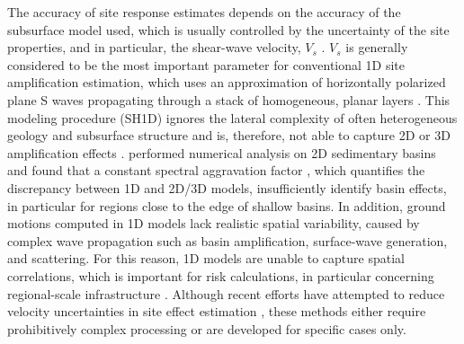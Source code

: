 The accuracy of site response estimates depends on the accuracy of the subsurface model used, which is usually controlled by the uncertainty of the site properties, and in particular, the shear-wave velocity, $V_s$ . $V_s$ is generally considered to be the most important parameter for conventional 1D site amplification estimation, which uses an approximation of horizontally polarized plane S waves propagating through a stack of homogeneous, planar layers . This modeling procedure (SH1D) ignores the lateral complexity of often heterogeneous geology and subsurface structure and is, therefore, not able to capture 2D or 3D amplification effects . \citet{zhuSeismicAggravationShallow2018} performed numerical analysis on 2D sedimentary basins and found that a constant spectral aggravation factor \citep{chavez-garciaComplexSiteEffects2000}, which quantifies the discrepancy between 1D and 2D/3D models, insufficiently identify basin effects, in particular for regions close to the edge of shallow basins. In addition, ground motions computed in 1D models lack realistic spatial variability, caused by complex wave propagation such as basin amplification, surface-wave generation, and scattering. For this reason, 1D models are unable to capture spatial correlations, which is important for risk calculations, in particular concerning regional-scale infrastructure . Although recent efforts have attempted to reduce velocity uncertainties in site effect estimation \citep{matavosicPracticesProceduresSitespecific2012,teagueMeasuredVsPredicted2018}, these methods either require prohibitively complex processing or are developed for specific cases only.

